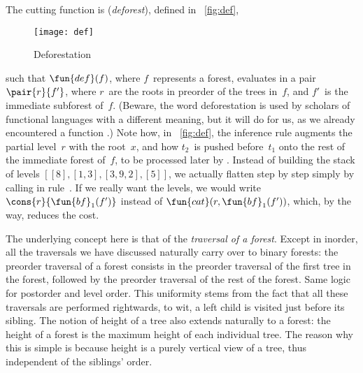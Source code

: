 The cutting function is 
(\emph{deforest}), defined in \fig~\vref{fig:def},
\begin{figure}[b]
\abovedisplayskip=0pt
\belowdisplayskip=0pt
\centering
\texttt{[image: def]}
\caption{Deforestation}
\label{fig:def}
\end{figure}
such that \(\fun{def}(f)\), where \(f\)~represents a forest, evaluates
in a pair \(\pair{r}{f'}\), where \(r\)~are the roots in preorder of
the trees in~\(f\), and \(f'\)~is the immediate subforest
of~\(f\). (Beware, the word deforestation is used by scholars of
functional languages with a different meaning, but it will do for us,
as we already encountered a function
.) Note how, in \fig~\vref{fig:def},
the inference rule augments the partial level~\(r\) with the
root~\(x\), and how \(t_2\)~is pushed before~\(t_1\) onto the rest of
the immediate forest of~\(f\), to be processed later by
. Instead of building the
stack of levels \([[8], [1,3], [3,9,2], [5]]\), we actually flatten
step by step simply by calling  in
rule~\clause{\mu}. If we really want the levels, we would write
\(\cons{r}{\fun{bf}_1(f')}\) instead of
\(\fun{cat}(r,\fun{bf}_1(f'))\), which, by the
way, reduces the cost.

The underlying concept here is that of the \emph{traversal of a
  forest}. Except in inorder, all the traversals we have discussed
naturally carry over to binary forests: the preorder traversal of a
forest consists in the preorder traversal of the first tree in the
forest, followed by the preorder traversal of the rest of the
forest. Same logic for postorder and level order. This uniformity
stems from the fact that all these traversals are performed
rightwards, to wit, a left child is visited just before its sibling.
The notion of height of a tree also extends
naturally to a forest: the height of a forest is the maximum height of
each individual tree. The reason why this is simple is because height
is a purely vertical view of a tree, thus independent of the siblings'
order.

